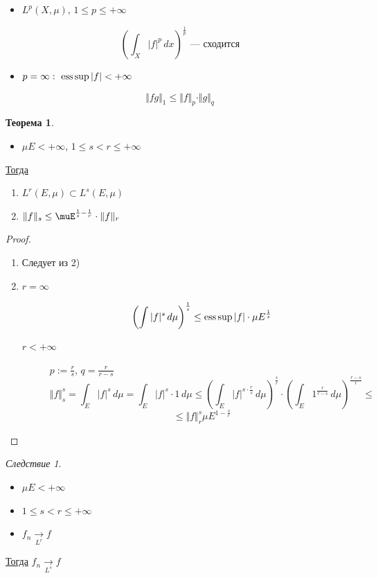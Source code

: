 \documentclass[oneside]{book}
\theoremstyle{plain}
\theoremstyle{remark}
\newtheorem{corollary}{Следствие}[theorem]
\theoremstyle{definition}
\newtheorem{theorem}{Теорема}[section]
\begin{document}
\begin{itemize}
\item \(L^p(X, \mu)\), \(1 \le p \le +\infty\)
\end{itemize}
\[ \left(\int_X |f|^p\,dx\right)^{\frac{1}{p}}\text{ --- сходится} \]
\begin{itemize}
\item \(p = \infty:\ \mathop{\rm ess\,sup}\limits |f| < +\infty\)
\end{itemize}
\[ \Vert fg \Vert_1 \le \Vert f \Vert_p \cdot \Vert g \Vert_q\]
\begin{theorem}
\-
\begin{itemize}
\item \(\mu E < +\infty\), \(1 \le s < r \le +\infty\)
\end{itemize}
\uline{Тогда}
\begin{enumerate}
\item \(L^r(E, \mu) \subset L^s(E, \mu)\)
\item \(\Vert f \Vert_s \le \muE^{\frac{1}{s} - \frac{1}{r}}\cdot \Vert f \Vert_r\)
\end{enumerate}
\end{theorem}
\begin{proof}
\-
\begin{enumerate}
\item Следует из 2)
\item \begin{description}
\item[{\(r = \infty\)}] \[\left(\int |f|^s\,d\mu\right)^{\frac{1}{s}} \le \mathop{\rm ess\,sup}\limits |f| \cdot \mu E^{\frac{1}{s}}\]
\item[{\(r < +\infty\)}] \(p := \frac{r}{s}\), \(q = \frac{r}{r - s}\)
\[ \Vert f \Vert_s^s = \int_E |f|^s \,d\mu = \int_E |f|^s\cdot 1 \, d\mu \le \left(\int_E |f|^{s \cdot \frac{r}{s}}\,d\mu\right)^{\frac{s}{r}} \cdot \left(\int_E 1^{\frac{r}{r - s}}\,d\mu\right)^{\frac{r - s}{r}} \le \]
\[ \le \Vert f \Vert_r^s \mu E^{1 - \frac{s}{r}} \]
\end{description}
\end{enumerate}
\end{proof}
\begin{corollary}
\-
\begin{itemize}
\item \(\mu E < +\infty\)
\item \(1 \le s < r \le +\infty\)
\item \(f_n \xrightarrow[L^r]{} f\)
\end{itemize}
\uline{Тогда} \(f_n \xrightarrow[L^s]{} f\)
\end{corollary}
\end{document}
